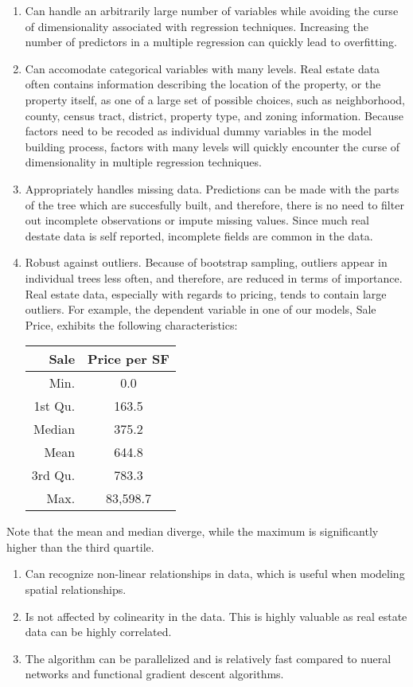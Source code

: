 \documentclass[]{article}
\providecommand{\tightlist}{%
  \setlength{\itemsep}{0pt}\setlength{\parskip}{0pt}}
\begin{document}
\begin{enumerate}
\def\labelenumi{\arabic{enumi}.}
\item
  Can handle an arbitrarily large number of variables while avoiding the
  curse of dimensionality associated with regression techniques.
  Increasing the number of predictors in a multiple regression can
  quickly lead to overfitting.
\item
  Can accomodate categorical variables with many levels. Real estate
  data often contains information describing the location of the
  property, or the property itself, as one of a large set of possible
  choices, such as neighborhood, county, census tract, district,
  property type, and zoning information. Because factors need to be
  recoded as individual dummy variables in the model building process,
  factors with many levels will quickly encounter the curse of
  dimensionality in multiple regression techniques.
\item
  Appropriately handles missing data. Predictions can be made with the
  parts of the tree which are succesfully built, and therefore, there is
  no need to filter out incomplete observations or impute missing
  values. Since much real destate data is self reported, incomplete
  fields are common in the data.
\item
  Robust against outliers. Because of bootstrap sampling, outliers
  appear in individual trees less often, and therefore, are reduced in
  terms of importance. Real estate data, especially with regards to
  pricing, tends to contain large outliers. For example, the dependent
  variable in one of our models, Sale Price, exhibits the following
  characteristics:

  \begin{longtable}[]{@{}rc@{}}
  \toprule
  Sale & Price per SF\tabularnewline
  \midrule
  \endhead
  Min. & 0.0\tabularnewline
  1st Qu. & 163.5\tabularnewline
  Median & 375.2\tabularnewline
  Mean & 644.8\tabularnewline
  3rd Qu. & 783.3\tabularnewline
  Max. & 83,598.7\tabularnewline
  \bottomrule
  \end{longtable}
\end{enumerate}

Note that the mean and median diverge, while the maximum is
significantly higher than the third quartile.

\begin{enumerate}
\def\labelenumi{\arabic{enumi}.}
\setcounter{enumi}{4}
\tightlist
\item
  Can recognize non-linear relationships in data, which is useful when
  modeling spatial relationships.
\item
  Is not affected by colinearity in the data. This is highly valuable as
  real estate data can be highly correlated.
\item
  The algorithm can be parallelized and is relatively fast compared to
  nueral networks and functional gradient descent algorithms.
\end{enumerate}
\end{document}

